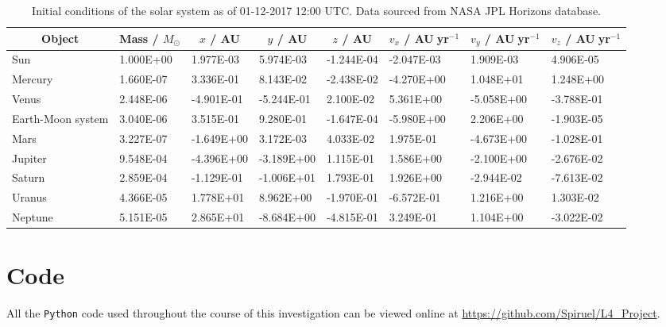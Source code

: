 \begin{table}
\caption[Initial conditions]{Initial conditions of the solar system as of 01-12-2017 12:00 UTC. Data sourced from NASA JPL Horizons database.}\vspace{3ex}
\label{table:init_con}
\begin{tabular}{llllllll} \toprule \toprule
\multicolumn{1}{c}{Object} & \multicolumn{1}{c}{Mass / $M_{\odot}$} & \multicolumn{1}{c}{$x$ / AU} & \multicolumn{1}{c}{$y$ / AU} & \multicolumn{1}{c}{$z$ / AU} & \multicolumn{1}{c}{$v_x$ / AU$\;$yr$^{-1}$}& \multicolumn{1}{c}{$v_y$  / AU$\;$yr$^{-1}$}& \multicolumn{1}{c}{$v_z$  / AU$\;$yr$^{-1}$}\\ \midrule
Sun & 1.000E+00 & 1.977E-03 & 5.974E-03 & -1.244E-04 & -2.047E-03 & 1.909E-03 & 4.906E-05 \\
Mercury & 1.660E-07 & 3.336E-01 & 8.143E-02 & -2.438E-02 & -4.270E+00 & 1.048E+01 & 1.248E+00 \\
Venus & 2.448E-06 & -4.901E-01 & -5.244E-01 & 2.100E-02 & 5.361E+00 & -5.058E+00 & -3.788E-01 \\
Earth-Moon system & 3.040E-06 & 3.515E-01 & 9.280E-01 & -1.647E-04 & -5.980E+00 & 2.206E+00 & -1.903E-05 \\
Mars & 3.227E-07 & -1.649E+00 & 3.172E-03 & 4.033E-02 & 1.975E-01 & -4.673E+00 & -1.028E-01 \\
Jupiter & 9.548E-04 & -4.396E+00 & -3.189E+00 & 1.115E-01 & 1.586E+00 & -2.100E+00 & -2.676E-02 \\
Saturn & 2.859E-04 & -1.129E-01 & -1.006E+01 & 1.793E-01 & 1.926E+00 & -2.944E-02 & -7.613E-02 \\
Uranus & 4.366E-05 & 1.778E+01 & 8.962E+00 & -1.970E-01 & -6.572E-01 & 1.216E+00 & 1.303E-02 \\
Neptune & 5.151E-05 & 2.865E+01 & -8.684E+00 & -4.815E-01 & 3.249E-01 & 1.104E+00 & -3.022E-02 \\
\bottomrule
\end{tabular}
\end{table}

\section*{Code}

All the \texttt{Python} code used throughout the course of this investigation can be viewed online at \url{https://github.com/Spiruel/L4_Project}.